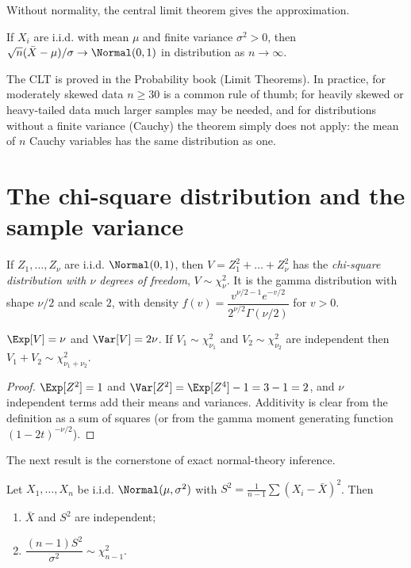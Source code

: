Without normality, the central limit theorem gives the approximation.

\begin{theorem}\label{thm:clt}
If $X_i$ are i.i.d. with mean $\mu$ and finite variance $\sigma^2>0$, then $\sqrt n(\bar{X}-\mu)/\sigma\to\Normal(0,1)$ in distribution as $n\to\infty$.
\end{theorem}

The CLT is proved in the Probability book (Limit Theorems). In practice, for moderately skewed data $n\ge30$ is a common rule of thumb; for heavily skewed or heavy-tailed data much larger samples may be needed, and for distributions without a finite variance (Cauchy) the theorem simply does not apply: the mean of $n$ Cauchy variables has the same distribution as one.

\section{The chi-square distribution and the sample variance}

\begin{definition}
If $Z_1,\dots,Z_\nu$ are i.i.d. $\Normal(0,1)$, then $V=Z_1^2+\dots+Z_\nu^2$ has the \emph{chi-square distribution with $\nu$ degrees of freedom}, $V\sim\chi^2_\nu$. It is the gamma distribution with shape $\nu/2$ and scale $2$, with density $f(v)=\dfrac{v^{\nu/2-1}e^{-v/2}}{2^{\nu/2}\Gamma(\nu/2)}$ for $v>0$.
\end{definition}

\begin{proposition}\label{prop:chisq}
$\Exp[V]=\nu$ and $\Var[V]=2\nu$. If $V_1\sim\chi^2_{\nu_1}$ and $V_2\sim\chi^2_{\nu_2}$ are independent then $V_1+V_2\sim\chi^2_{\nu_1+\nu_2}$.
\end{proposition}

\begin{proof}
$\Exp[Z^2]=1$ and $\Var[Z^2]=\Exp[Z^4]-1=3-1=2$, and $\nu$ independent terms add their means and variances. Additivity is clear from the definition as a sum of squares (or from the gamma moment generating function $(1-2t)^{-\nu/2}$).
\end{proof}

The next result is the cornerstone of exact normal-theory inference.

\begin{theorem}\label{thm:cochran}
Let $X_1,\dots,X_n$ be i.i.d. $\Normal(\mu,\sigma^2)$ with $S^2=\frac1{n-1}\sum(X_i-\bar{X})^2$. Then
\begin{enumerate}[label=(\roman*)]
  \item $\bar{X}$ and $S^2$ are independent;
  \item $\dfrac{(n-1)S^2}{\sigma^2}\sim\chi^2_{n-1}$.
\end{enumerate}
\end{theorem}

